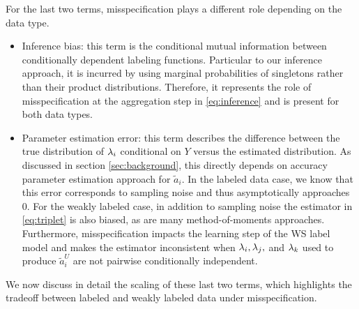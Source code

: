 For the last two terms, misspecification plays a different role depending on the data type. 
\begin{itemize}
    \item Inference bias: this term is the conditional mutual information between conditionally dependent labeling functions. Particular to our inference approach, it is incurred by using marginal probabilities of singletons rather than their product distributions. Therefore, it represents the role of misspecification at the aggregation step in \eqref{eq:inference} and is present for both data types.
    \item Parameter estimation error: this term describes the difference between the true distribution of $\lambda_i$ conditional on $Y$ versus the estimated distribution. As discussed in section \ref{sec:background}, this directly depends on accuracy parameter estimation approach for $\widetilde{a}_i$. In the labeled data case, we know that this error corresponds to sampling noise and thus asymptotically approaches $0$. For the weakly labeled case, in addition to sampling noise the estimator in \eqref{eq:triplet} is also biased, as are many method-of-moments approaches. Furthermore, misspecification impacts the learning step of the WS label model and makes the estimator inconsistent when $\lambda_i, \lambda_j,$ and $\lambda_k$ used to produce $\widetilde{a}_i^U$ are not pairwise conditionally independent.
\end{itemize}

We now discuss in detail the scaling of these last two terms, which highlights the tradeoff between labeled and weakly labeled data under misspecification.




